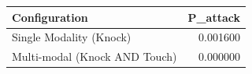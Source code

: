 \begin{tabular}{lr}
\toprule
Configuration & P_attack \\
\midrule
Single Modality (Knock) & 0.001600 \\
Multi-modal (Knock AND Touch) & 0.000000 \\
\bottomrule
\end{tabular}

